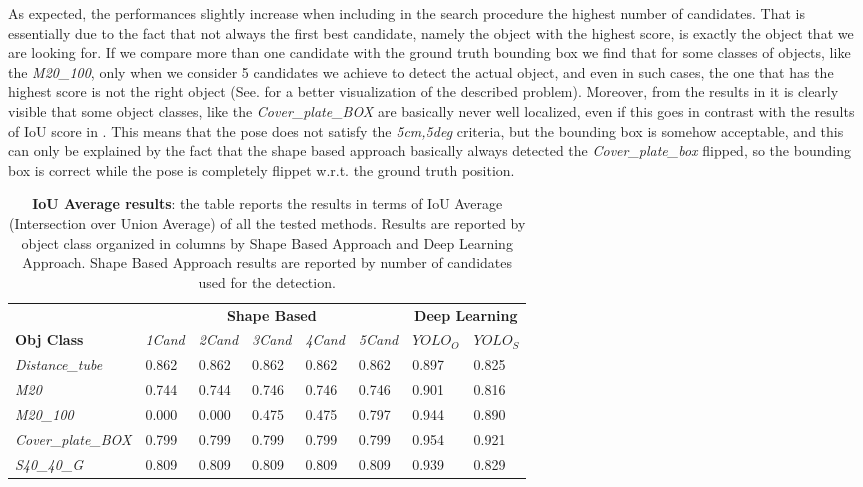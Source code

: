 As expected, the performances slightly increase when including in the search procedure the highest number of candidates. That is essentially due to the fact that not always the first best candidate, namely the object with the highest score, is exactly the object that we are looking for. If we compare more than one candidate with the ground truth bounding box we find that for some classes of objects, like the \emph{M20\_100}, only when we consider 5 candidates we achieve to detect the actual object, and even in such cases, the one that has the highest score is not the right object (See.  for a better visualization of the described problem). Moreover, from the results in  it is clearly visible that some object classes, like the \emph{Cover\_plate\_BOX} are basically never well localized, even if this goes in contrast with the results of IoU score in . This means that the pose does not satisfy the \emph{5cm,5deg} criteria, but the bounding box is somehow acceptable, and this can only be explained by the fact that the shape based approach basically always detected the \emph{Cover\_plate\_box} flipped, so the bounding box is correct while the pose is completely flippet w.r.t. the ground truth position.

\begin{table}
 \centering

   \begin{tabular}{ llllllll }
   &\multicolumn{5}{c}{ \textbf{Shape Based} } &\multicolumn{2}{c}{ \textbf{Deep Learning} }\\
   \cmidrule(lr){2-6} \cmidrule(lr){7-8}
   \textbf{Obj Class} & \emph{1Cand} & \emph{2Cand} & \emph{3Cand} &\emph{4Cand} & \emph{5Cand} & $YOLO_O$ & $YOLO_S$\\
   \cmidrule(lr){1-8}   
   \emph{Distance\_tube} & 0.862 & 0.862 & 0.862 & 0.862 & 0.862 & \cellcolor{gray!25}0.897 & 0.825 \\ 
   \emph{M20} & 0.744 & 0.744 & 0.746 & 0.746 & 0.746 & \cellcolor{gray!25}0.901 & 0.816 \\ 
   \emph{M20\_100} & 0.000 & 0.000 & 0.475 & 0.475 & 0.797 & \cellcolor{gray!25}0.944 & 0.890 \\
   \emph{Cover\_plate\_BOX} & 0.799 & 0.799 & 0.799 & 0.799 & 0.799 & \cellcolor{gray!25}0.954 & 0.921 \\
   \emph{S40\_40\_G} & 0.809 & 0.809 & 0.809 & 0.809 & 0.809 & \cellcolor{gray!25}0.939 & 0.829 \\
   \end{tabular} 
   \caption{\textbf{IoU Average results}: the table reports the results in terms of IoU Average (Intersection over Union Average) of all the tested methods. Results are reported by object class organized in columns by Shape Based Approach and Deep Learning Approach. Shape Based Approach results are reported by number of candidates used for the detection.}
 \label{tab:big_table_results}
\end{table}

